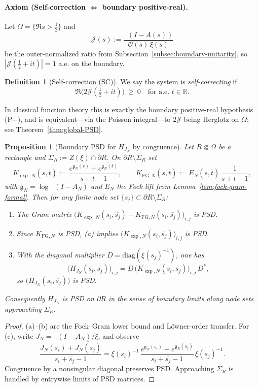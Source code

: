 \documentclass[11pt]{article}
\newtheorem{proposition}[theorem]{Proposition}
\theoremstyle{definition}
\newtheorem{definition}[theorem]{Definition}
\theoremstyle{remark}
\newcommand{\R}{\mathbb{R}}
\DeclareMathOperator{\dettwo}{det_2}
\begin{document}
\paragraph{Axiom (Self-correction $\Leftrightarrow$ boundary positive-real).}
Let \(\Omega=\{\Re s>\tfrac12\}\) and
\[\mathcal J(s):=\frac{\dettwo(I-A(s))}{\mathcal O(s)\,\xi(s)}\]
be the outer-normalized ratio from Subsection~\ref{subsec:boundary-unitarity}, so $|\mathcal J(\tfrac12+it)|=1$ a.e. on the boundary. 
\begin{definition}[Self-correction (SC)]\label{def:SC}
We say the system is \emph{self-correcting} if
\[\Re\bigl(2\mathcal J(\tfrac12+it)\bigr)\ \ge\ 0\quad\text{for a.e. }t\in\R.\]
\end{definition}
In classical function theory this is exactly the boundary positive-real hypothesis (P+), and is equivalent—via the Poisson integral—to $2\mathcal J$ being Herglotz on $\Omega$; see Theorem~\ref{thm:global-PSD}.
\begin{proposition}[Boundary PSD for $H_{J_N}$ by congruence]\label{prop:boundary-psd-fixed}
Let $R\Subset\Omega$ be a rectangle and $\Sigma_R:=Z(\xi)\cap\partial R$. On $\partial R\setminus\Sigma_R$ set
\[
K_{\exp,N}(s,\bar t):=\frac{e^{\mathfrak g_N(s)}+\overline{e^{\mathfrak g_N(t)}}}{s+\bar t-1},\qquad 
K_{\mathrm{FG},N}(s,\bar t):=E_N(s,\bar t)\,\frac{1}{s+\bar t-1},
\]
with $\mathfrak g_N=\log\dettwo(I-A_N)$ and $E_N$ the Fock lift from Lemma~\ref{lem:fock-gram-formal}. Then for any finite node set $\{s_j\}\subset\partial R\setminus\Sigma_R$:
\begin{enumerate}
\item[\textup{(a)}] The Gram matrix $\big(K_{\exp,N}(s_i,\overline{s_j})-K_{\mathrm{FG},N}(s_i,\overline{s_j})\big)_{i,j}$ is PSD.
\item[\textup{(b)}] Since $K_{\mathrm{FG},N}$ is PSD, (a) implies $\big(K_{\exp,N}(s_i,\overline{s_j})\big)_{i,j}$ is PSD.
\item[\textup{(c)}] With the diagonal multiplier $D=\mathrm{diag}(\xi(s_j)^{-1})$, one has
\[
\Big(H_{J_N}(s_i,\overline{s_j})\Big)_{i,j}=D\,\Big(K_{\exp,N}(s_i,\overline{s_j})\Big)_{i,j}\,D^{*},
\]
so $\big(H_{J_N}(s_i,\overline{s_j})\big)$ is PSD.
\end{enumerate}
Consequently $H_{J_N}$ is PSD on $\partial R$ in the sense of boundary limits along node sets approaching $\Sigma_R$.
\end{proposition}
\begin{proof}
(a)–(b) are the Fock–Gram lower bound and Löwner-order transfer. For (c), write $J_N=\dettwo(I-A_N)/\xi$, and observe
\[\frac{J_N(s_i)+\overline{J_N(s_j)}}{s_i+\overline{s_j}-1}=\xi(s_i)^{-1}\,\frac{e^{\mathfrak g_N(s_i)}+\overline{e^{\mathfrak g_N(s_j)}}}{s_i+\overline{s_j}-1}\,\overline{\xi(s_j)^{-1}}.\]
Congruence by a nonsingular diagonal preserves PSD. Approaching $\Sigma_R$ is handled by entrywise limits of PSD matrices.
\end{proof}
\end{document}
